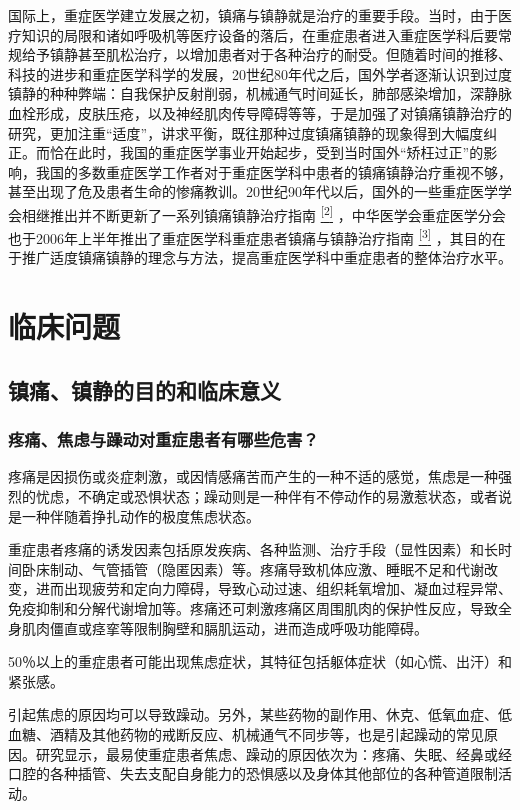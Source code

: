 国际上，重症医学建立发展之初，镇痛与镇静就是治疗的重要手段。当时，由于医疗知识的局限和诸如呼吸机等医疗设备的落后，在重症患者进入重症医学科后要常规给予镇静甚至肌松治疗，以增加患者对于各种治疗的耐受。但随着时间的推移、科技的进步和重症医学科学的发展，20世纪80年代之后，国外学者逐渐认识到过度镇静的种种弊端：自我保护反射削弱，机械通气时间延长，肺部感染增加，深静脉血栓形成，皮肤压疮，以及神经肌肉传导障碍等等，于是加强了对镇痛镇静治疗的研究，更加注重“适度”，讲求平衡，既往那种过度镇痛镇静的现象得到大幅度纠正。而恰在此时，我国的重症医学事业开始起步，受到当时国外“矫枉过正”的影响，我国的多数重症医学工作者对于重症医学科中患者的镇痛镇静治疗重视不够，甚至出现了危及患者生命的惨痛教训。20世纪90年代以后，国外的一些重症医学学会相继推出并不断更新了一系列镇痛镇静治疗指南
\protect\hyperlink{text00027.htmlux5cux23ch2-26}{\textsuperscript{{[}2{]}}}
，中华医学会重症医学分会也于2006年上半年推出了重症医学科重症患者镇痛与镇静治疗指南
\protect\hyperlink{text00027.htmlux5cux23ch3-26}{\textsuperscript{{[}3{]}}}
，其目的在于推广适度镇痛镇静的理念与方法，提高重症医学科中重症患者的整体治疗水平。

\section{临床问题}

\subsection{镇痛、镇静的目的和临床意义}

\subsubsection{疼痛、焦虑与躁动对重症患者有哪些危害？}

疼痛是因损伤或炎症刺激，或因情感痛苦而产生的一种不适的感觉，焦虑是一种强烈的忧虑，不确定或恐惧状态；躁动则是一种伴有不停动作的易激惹状态，或者说是一种伴随着挣扎动作的极度焦虑状态。

重症患者疼痛的诱发因素包括原发疾病、各种监测、治疗手段（显性因素）和长时间卧床制动、气管插管（隐匿因素）等。疼痛导致机体应激、睡眠不足和代谢改变，进而出现疲劳和定向力障碍，导致心动过速、组织耗氧增加、凝血过程异常、免疫抑制和分解代谢增加等。疼痛还可刺激疼痛区周围肌肉的保护性反应，导致全身肌肉僵直或痉挛等限制胸壁和膈肌运动，进而造成呼吸功能障碍。

50％以上的重症患者可能出现焦虑症状，其特征包括躯体症状（如心慌、出汗）和紧张感。

引起焦虑的原因均可以导致躁动。另外，某些药物的副作用、休克、低氧血症、低血糖、酒精及其他药物的戒断反应、机械通气不同步等，也是引起躁动的常见原因。研究显示，最易使重症患者焦虑、躁动的原因依次为：疼痛、失眠、经鼻或经口腔的各种插管、失去支配自身能力的恐惧感以及身体其他部位的各种管道限制活动。

